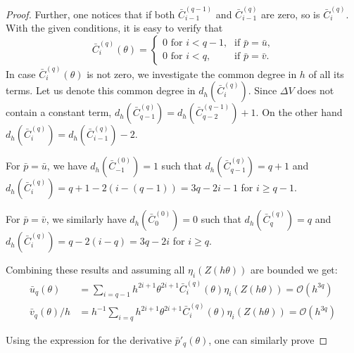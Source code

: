 \begin{proof}
  Further, one notices that if both $\bar{C}_{i-1}^{(q-1)}$ and $\bar{C}_{i-1}^{(q)}$ are zero, so is $\bar{C}_{i}^{(q)}$. With the given conditions,
  it is easy to verify that
  \[ \bar{C}_{i}^{(q)}(\theta)   =  \begin{cases}
      \text{$0$ for $i <q -1$,} & \text{if $\bar{p} = \bar{u}$,} \\
      \text{$0$ for $i <q$,}    & \text{if $\bar{p} = \bar{v}$.}
    \end{cases} \]
  In case $\bar{C}_{i}^{(q)}(\theta)$ is not zero, we investigate the common degree in $h$ of all its terms. Let us denote this common degree in $d_h(\bar{C}_{i}^{(q)})$.  Since $\Delta V$ does not contain a constant term, $d_h\left(\bar{C}_{q-1}^{(q)}\right) = d_h\left(\bar{C}_{q-2}^{(q-1)}\right)+1$.
  On the other hand $d_h\left(\bar{C}_{i}^{(q)}\right)=d_h\left(\bar{C}_{i-1}^{(q)}\right)-2$.

  For $\bar{p}=\bar{u}$, we have $d_h\left(\bar{C}_{-1}^{(0)}\right)=1$ such that $d_h\left(\bar{C}_{q-1}^{(q)}\right)=q+1$ and $d_h\left(\bar{C}_{i}^{(q)}\right) = q+1-2(i-(q-1))=3q-2i-1$ for $i \geq q-1$.

  For $\bar{p}=\bar{v}$, we similarly have $d_h\left(\bar{C}_{0}^{(0)}\right)=0$ such that $d_h\left(\bar{C}_{q}^{(q)}\right)=q$ and $d_h\left(\bar{C}_{i}^{(q)}\right) = q-2(i-q)=3q-2i$ for $i \geq q$.

  Combining these results and assuming all $\eta_i(Z(h\theta))$ are bounded we get:
  \begin{align*}
    \bar{u}_{q}(\theta)   & =  \sum_{i=q-1} h^{2i+1} \theta^{2i+1} \bar{C}^{(q)}_i(\theta) \eta_{i}(Z(h\theta)) = \mathcal{O}(h^{3q})     \\
    \bar{v}_{q}(\theta)/h & = h^{-1} \sum_{i=q} h^{2i+1} \theta^{2i+1} \bar{C}^{(q)}_i(\theta) \eta_{i}(Z(h\theta)) = \mathcal{O}(h^{3q})
  \end{align*}

  Using the expression for the derivative $\bar{p}'_{q}(\theta)$, one can similarly prove


\end{proof}
